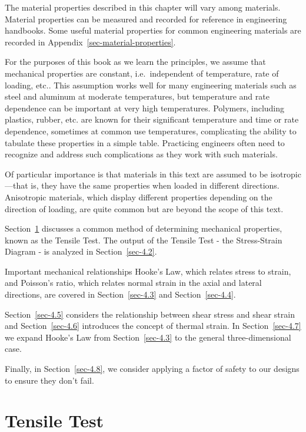 \documentclass[
  letterpaper,
  DIV=11,
  numbers=noendperiod]{scrreprt}
\theoremstyle{definition}
\theoremstyle{remark}
\begin{document}
The material properties described in this chapter will vary among
materials. Material properties can be measured and recorded for
reference in engineering handbooks. Some useful material properties for
common engineering materials are recorded in
Appendix~\ref{sec-material-properties}.

For the purposes of this book as we learn the principles, we assume that
mechanical properties are constant, i.e.~independent of temperature,
rate of loading, etc.. This assumption works well for many engineering
materials such as steel and aluminum at moderate temperatures, but
temperature and rate dependence can be important at very high
temperatures. Polymers, including plastics, rubber, etc. are known for
their significant temperature and time or rate dependence, sometimes at
common use temperatures, complicating the ability to tabulate these
properties in a simple table. Practicing engineers often need to
recognize and address such complications as they work with such
materials.

Of particular importance is that materials in this text are assumed to
be isotropic---that is, they have the same properties when loaded in
different directions. Anisotropic materials, which display different
properties depending on the direction of loading, are quite common but
are beyond the scope of this text.

Section~\ref{sec-4.1} discusses a common method of determining
mechanical properties, known as the Tensile Test. The output of the
Tensile Test - the Stress-Strain Diagram - is analyzed in
Section~\ref{sec-4.2}.

Important mechanical relationships Hooke's Law, which relates stress to
strain, and Poisson's ratio, which relates normal strain in the axial
and lateral directions, are covered in Section~\ref{sec-4.3} and
Section~\ref{sec-4.4}.

Section~\ref{sec-4.5} considers the relationship between shear stress
and shear strain and Section~\ref{sec-4.6} introduces the concept of
thermal strain. In Section~\ref{sec-4.7} we expand Hooke's Law from
Section~\ref{sec-4.3} to the general three-dimensional case.

Finally, in Section~\ref{sec-4.8}, we consider applying a factor of
safety to our designs to ensure they don't fail.

\section{Tensile Test}\label{sec-4.1}
\end{document}
